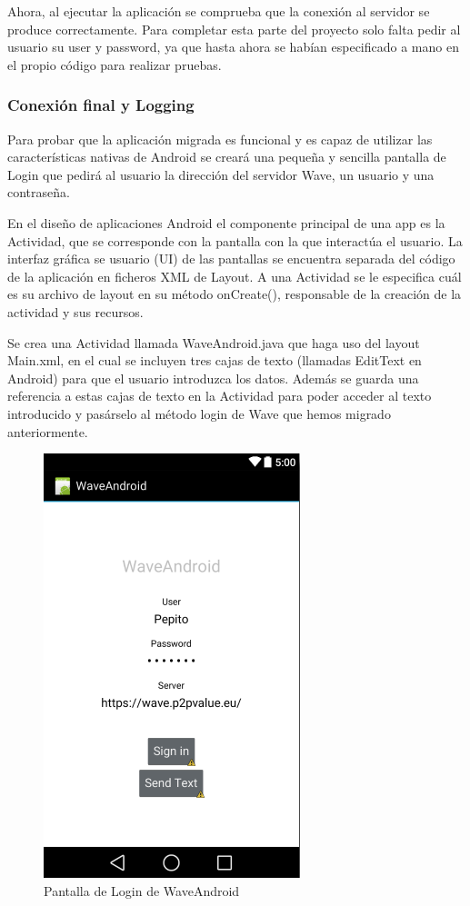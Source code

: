       Ahora, al ejecutar la aplicación se comprueba que la conexión al servidor se produce correctamente. Para completar esta parte del proyecto solo falta pedir al usuario su user y password, ya que hasta ahora se habían especificado a mano en el propio código para realizar pruebas.
	    
    		\subsubsection{Conexión final y Logging}\label{sssec:conFinAndLogin}
    
    Para probar que la aplicación migrada es funcional y es capaz de utilizar las características nativas de Android se creará una pequeña y sencilla pantalla de Login que pedirá al usuario la dirección del servidor Wave, un usuario y una contraseña.
    
    En el diseño de aplicaciones Android el componente principal de una app es la Actividad, que se corresponde con la pantalla con la que interactúa el usuario. La interfaz gráfica se usuario (UI) de las pantallas se encuentra separada del código de la aplicación en ficheros XML de Layout\cite{ref:android_layout}. A una Actividad se le especifica cuál es su archivo de layout en su método onCreate(), responsable de la creación de la actividad y sus recursos. 
    
    Se crea una Actividad llamada WaveAndroid.java que haga uso del layout Main.xml, en el cual se incluyen tres cajas de texto (llamadas EditText en Android) para que el usuario introduzca los datos. Además se guarda una referencia a estas cajas de texto en la Actividad para poder acceder al texto introducido y pasárselo al método login de Wave que hemos migrado anteriormente.
    
    	\begin{figure}[H]
      \centering
	\includegraphics[keepaspectratio, scale=0.6]{Media/Captures/waveAndroidLogin.png}
      \caption{Pantalla de Login de WaveAndroid}
      \label{fig:android_waveLogin}
    \end{figure}
    

